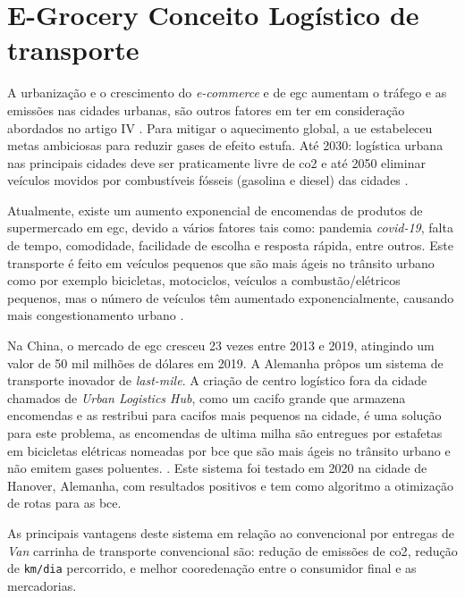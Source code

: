\section{E-Grocery Conceito Logístico de transporte}
\label{sec:egcconceitologisticotransporte}


A urbanização e o crescimento do \textit{e-commerce} e de \gls{egc} aumentam o tráfego e as emissões nas cidades urbanas, são outros fatores em ter em consideração abordados no artigo IV \cite{article2}.
Para mitigar o aquecimento global, a \gls{ue} estabeleceu metas ambiciosas para reduzir gases de efeito estufa.
Até 2030: logística urbana nas principais cidades deve ser praticamente livre de \gls{co2} e até 2050 eliminar veículos movidos por combustíveis fósseis (gasolina e diesel) das cidades \cite{article2}.

Atualmente, existe um aumento exponencial de encomendas de produtos de supermercado em \gls{egc}, devido a vários fatores tais como: pandemia \textit{covid-19}, falta de tempo, comodidade, facilidade de escolha e resposta rápida, entre outros.
Este transporte é feito em veículos pequenos que são mais ágeis no trânsito urbano como por exemplo bicicletas, motociclos, veículos a combustão/elétricos pequenos, mas o número de veículos têm aumentado exponencialmente, causando mais congestionamento urbano \cite{article2}.

Na China, o mercado de \gls{egc} cresceu 23 vezes entre 2013 e 2019, atingindo um valor de 50 mil milhões de dólares em 2019\cite{article2}.
A Alemanha prôpos um sistema de transporte inovador de \textit{last-mile}.
A criação de centro logístico fora da cidade chamados de \textit{Urban Logistics Hub}, como um cacifo grande que armazena encomendas e as restribui para cacifos mais pequenos na cidade, é uma solução para este problema, as encomendas de ultima milha são entregues por estafetas em bicicletas elétricas nomeadas por \gls{bce}  que são mais ágeis no trânsito urbano e não emitem gases poluentes. \cite{article2}.
Este sistema foi testado em 2020 na cidade de Hanover, Alemanha, com resultados positivos e tem como algoritmo a otimização de rotas para as \gls{bce}.

As principais vantagens deste sistema em relação ao convencional por entregas de \textit{Van} carrinha de transporte convencional são: redução de emissões de \gls{co2}, redução de \verb|km/dia| percorrido, e melhor cooredenação entre o consumidor final e as mercadorias\cite{article2}.


